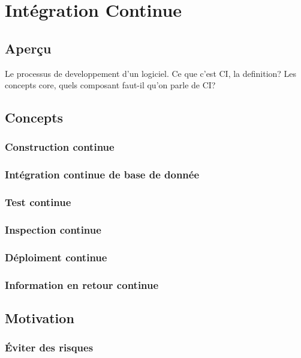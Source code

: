 \chapter{Intégration Continue}
\label{chap:integrationcontinue}

\nocite{duvall:conint}

\section{Aperçu}

Le processus de developpement d'un logiciel.
Ce que c'est CI, la definition?
Les concepts core, quels composant faut-il qu'on parle de CI?

\section{Concepts}

\subsection{Construction continue}

\subsection{Intégration continue de base de donnée}

\subsection{Test continue}

\subsection{Inspection continue}

\subsection{Déploiment continue}

\subsection{Information en retour continue}

\section{Motivation}

\subsection{Éviter des risques}

